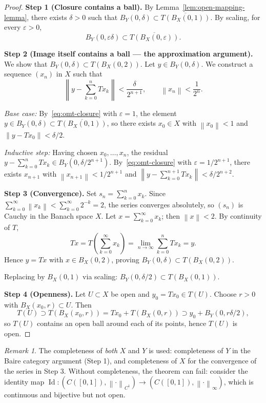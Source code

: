 \documentclass[a4paper,12pt]{book}
\DeclareMathOperator{\Id}{Id}
\newcommand{\norm}[1]{\left\| #1 \right\|}
\theoremstyle{definition}
\theoremstyle{plain}
\theoremstyle{remark}
\newtheorem{remark}[definition]{Remark}
\begin{document}
\begin{proof}
\textbf{Step 1 (Closure contains a ball).}
By Lemma~\ref{lem:open-mapping-lemma}, there exists $\delta > 0$ such that
$B_Y(0, \delta) \subset \overline{T(B_X(0,1))}$. By scaling, for every $\varepsilon > 0$,
\begin{equation}\label{eq:omt-closure}
  B_Y(0, \varepsilon \delta) \subset \overline{T(B_X(0,\varepsilon))}.
\end{equation}

\textbf{Step 2 (Image itself contains a ball --- the approximation argument).}
We show that $B_Y(0, \delta) \subset T(B_X(0, 2))$. Let $y \in B_Y(0, \delta)$.
We construct a sequence $(x_n)$ in $X$ such that
\[
  \left\| y - \sum_{k=0}^{n} T x_k \right\| < \frac{\delta}{2^{n+1}},
  \qquad \norm{x_n} < \frac{1}{2^n}.
\]

\textit{Base case:} By~\eqref{eq:omt-closure} with $\varepsilon = 1$, the element
$y \in B_Y(0,\delta) \subset \overline{T(B_X(0,1))}$, so there exists $x_0 \in X$
with $\norm{x_0} < 1$ and $\norm{y - Tx_0} < \delta/2$.

\textit{Inductive step:} Having chosen $x_0, \ldots, x_n$, the residual
$y - \sum_{k=0}^n Tx_k \in B_Y(0, \delta/2^{n+1})$. By~\eqref{eq:omt-closure}
with $\varepsilon = 1/2^{n+1}$, there exists $x_{n+1}$ with
$\norm{x_{n+1}} < 1/2^{n+1}$ and
$\norm{y - \sum_{k=0}^{n+1} Tx_k} < \delta/2^{n+2}$.

\textbf{Step 3 (Convergence).}
Set $s_n = \sum_{k=0}^n x_k$. Since $\sum_{k=0}^\infty \norm{x_k}
< \sum_{k=0}^\infty 2^{-k} = 2$, the series converges absolutely, so $(s_n)$ is
Cauchy in the Banach space $X$. Let $x = \sum_{k=0}^\infty x_k$; then
$\norm{x} < 2$. By continuity of $T$,
\[
  Tx = T\!\left(\sum_{k=0}^\infty x_k\right) = \lim_{n\to\infty}
  \sum_{k=0}^n Tx_k = y.
\]
Hence $y = Tx$ with $x \in B_X(0,2)$, proving $B_Y(0,\delta) \subset T(B_X(0,2))$.

Replacing by $B_X(0,1)$ via scaling: $B_Y(0, \delta/2) \subset T(B_X(0,1))$.

\textbf{Step 4 (Openness).}
Let $U \subset X$ be open and $y_0 = Tx_0 \in T(U)$. Choose $r > 0$ with
$B_X(x_0, r) \subset U$. Then
\[
  T(U) \supset T(B_X(x_0,r)) = Tx_0 + T(B_X(0,r))
  \supset y_0 + B_Y(0, r\delta/2),
\]
so $T(U)$ contains an open ball around each of its points, hence $T(U)$ is open.
\end{proof}

\begin{remark}\label{rem:omt-completeness}
The completeness of \emph{both} $X$ and $Y$ is used: completeness of $Y$ in the
Baire category argument (Step 1), and completeness of $X$ for the convergence of
the series in Step 3. Without completeness, the theorem can fail: consider the
identity map $\Id \colon (C([0,1]), \norm{\cdot}_{C^1}) \to (C([0,1]),
\norm{\cdot}_\infty)$, which is continuous and bijective but not open.
\end{remark}
\end{document}
